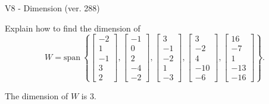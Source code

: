 \begin{exercise}
  \begin{exerciseTitle}V8 - Dimension (ver. 288)\end{exerciseTitle}
  \begin{exerciseStatement}
    Explain how to find the dimension of 
\[W=\mathrm{span}\ \left\{\left[\begin{array}{r}
-2 \\
1 \\
-1 \\
3 \\
2
\end{array}\right] , \left[\begin{array}{r}
-1 \\
0 \\
2 \\
-4 \\
-2
\end{array}\right] , \left[\begin{array}{r}
3 \\
-1 \\
-2 \\
1 \\
-3
\end{array}\right] , \left[\begin{array}{r}
3 \\
-2 \\
4 \\
-10 \\
-6
\end{array}\right] , \left[\begin{array}{r}
16 \\
-7 \\
1 \\
-13 \\
-16
\end{array}\right]\right\}.\]



  \end{exerciseStatement}
  \begin{exerciseAnswer}
   The dimension of \(W\) is  \(3\).
  


  \end{exerciseAnswer}
\end{exercise}